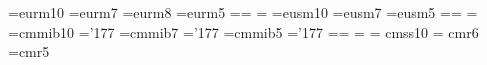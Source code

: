 \def\hat{\widehat}
%

\font\teneurm=eurm10 \font\seveneurm=eurm7 \font\eighteurm=eurm8 \font\fiveeurm=eurm5
\newfam\eurmfam
\textfont\eurmfam=\teneurm \scriptfont\eurmfam=\seveneurm
\scriptscriptfont\eurmfam=\fiveeurm
\def\eurm#1{{\fam\eurmfam\relax#1}}
\font\teneusm=eusm10 \font\seveneusm=eusm7 \font\fiveeusm=eusm5
\newfam\eusmfam
\textfont\eusmfam=\teneusm \scriptfont\eusmfam=\seveneusm
\scriptscriptfont\eusmfam=\fiveeusm
\def\eusm#1{{\fam\eusmfam\relax#1}}
\font\tencmmib=cmmib10 \skewchar\tencmmib='177
\font\sevencmmib=cmmib7 \skewchar\sevencmmib='177
\font\fivecmmib=cmmib5 \skewchar\fivecmmib='177
\newfam\cmmibfam
\textfont\cmmibfam=\tencmmib \scriptfont\cmmibfam=\sevencmmib
\scriptscriptfont\cmmibfam=\fivecmmib
\def\cmmib#1{{\fam\cmmibfam\relax#1}}
\def\FF{{\mathscr F}}
\overfullrule=0pt
\def\G{{\Gamma}}
\def\eG{{\eurm G}}
\def\neg{\negthinspace}
\def\MM{\mathscr{M}}
\def\M{{\MM}}
\def\CP{{\Bbb{CP}}}
\def\L{{\mathcal L}}
\def\U{{\mathcal U}}
\def\CN{{\cal V}}
\def\Y{{\mathcal Y}}
\def\V{{\mathcal V}}
\def\ade{{\mathrm{ad}(E)}}
\def\H{{\mathcal H}}
\def\W{{\mathcal W}}
\def\MH{{{\MM}_H}}
%
\def\ppi{{\boldsymbol{\mathscr{\pi}}}}
\def\tilde{\widetilde}
\def\bar{\overline}
\def\Z{{\Bbb Z}}
\def\AA{{\eurm A}}
\def\LLL{{\mathfrak L}}
\def\B{{\mathcal B}}
\def\T{{\bf T}}
\def\t{\widetilde }
\def\CO{{\mathcal O}}
\def\O{{\mathcal O}}
\def\F{{\mathcal F}}
\def\FF{{\eusm F}}
\def\A{{\mathcal A}}
\def\CW{{\mathcal W}}
\def\S{{\bf S}}
\def\R{{\Bbb R}}
\def\Lam#1{\Lambda_{#1}}
\def\SIgma{\Sigma}
\def\pf{{\rm Pf ~}}
\font\zfont = cmss10 %
\font\litfont = cmr6 \font\fvfont=cmr5
\def\bigone{\hbox{1\kern -.23em {\rm l}}}
\def\ZZ{\hbox{\zfont Z\kern-.4emZ}}
\def\half{{\litfont {1 \over 2}}}
\def\mx#1{m_{\hbox{\fvfont #1}}}
\def\gx#1{g_{\hbox{\fvfont #1}}}
\def\gG{{\cal G}}
\def\lamlam#1{\langle S_{#1}\rangle}
\def\CM{{\cal M}}
\def\C{{\Bbb C}}
\def\G{{\mathcal G}}
\def\Re{{\rm Re ~}}
\def\Im{{\rm Im ~}}
\def\lfm#1{\medskip\noindent\item{#1}}
\def\g{{\frak g}}
\def\CA{{\cal A}}
\def\CF{{\cal F}}
\def\ad{{\rm ad}}
\def\EE{{\mathcal E}}
\def\PP{\large{\mathscr P}}
\def\DD{\large{\mathscr D}}
\def\kk{{\mathscr{K}}}
\def\RR{\mathcal{R}}
\def\ttt{{\bf{t}}}
\def\cc{{\mathscr{C}}}
\def\CZ{?? Z}
\def\D{{\mathcal D}}
\def\rr{{\sf r}}

\newcommand{\transnote}[1]{\footnote{\textbf{译注｜}#1}}
\usepackage{booktabs}
\usepackage{longtable}
\usepackage{enumitem}
\usepackage{xurl}
